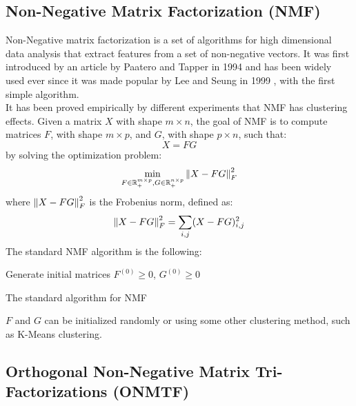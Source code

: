 \subsection{Non-Negative Matrix Factorization (NMF)}

Non-Negative matrix factorization is a set of algorithms for high dimensional data analysis that extract features from a set of non-negative vectors. It was first introduced by an article by Paatero and Tapper in 1994 \cite{10.1002/env.3170050203} and has been widely used ever since it was made popular by Lee and Seung in 1999 \cite{10.1038/44565}, with the first simple algorithm.\\
It has been proved empirically by different experiments \cite{10.5555/1005332.1044709, 10.1109/CVPR.2001.990477} that NMF has clustering effects.
Given a matrix $X$ with shape $m \times n$, the goal of NMF is to compute matrices $F$, with shape $m \times p$, and $G$, with shape $p \times n$, such that:
\begin{equation*}
X = FG
\end{equation*}
by solving the optimization problem:
\begin{equation*}
\min_{F \in \mathbb{R}^{m \times p}_+, G \in \mathbb{R}^{n \times p}_+} \left\lVert X - FG\right\rVert_F^2
\end{equation*}
where $\left\lVert X - FG\right\rVert_F^2$ is the Frobenius norm, defined as:
\begin{equation*}
\left\lVert X - FG\right\rVert_F^2 = \sum_{i,j} (X - FG)_{i,j}^2
\end{equation*}
The standard NMF algorithm is the following:
\vskip 0.7cm
\begin{algorithm}[H]
Generate initial matrices $F^{(0)} \geq 0$, $G^{(0)} \geq 0$\;
\caption{The standard algorithm for NMF}
\end{algorithm}
\vskip 0.7cm
$F$ and $G$ can be initialized randomly or using some other clustering method, such as K-Means clustering.


\subsection{Orthogonal Non-Negative Matrix Tri-Factorizations (ONMTF)}

